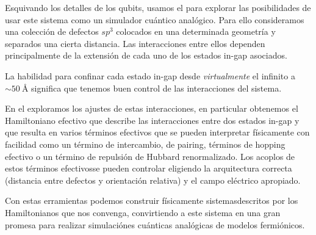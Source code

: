 Esquivando los detalles de los qubits, usamos el  para explorar las posibilidades de usar este sistema como un simulador cuántico analógico. Para ello consideramos una colección de defectos $sp^3$ colocados en una determinada geometría y separados una cierta distancia.
Las interacciones entre ellos dependen principalmente de la extensión de cada uno de los estados in-gap asociados.

La habilidad para confinar cada estado in-gap desde \emph{virtualmente} el infinito a $\sim\SI{50}{\angstrom}$ significa que tenemos buen control de las interacciones del sistema.


En el  exploramos los ajustes de estas interacciones, en particular obtenemos el Hamiltoniano efectivo que describe las interacciones entre dos estados in-gap y que resulta en varios términos efectivos que se pueden interpretar físicamente con facilidad como un término de intercambio, de pairing, términos de hopping efectivo o un término de repulsión de Hubbard renormalizado. Los acoplos de estos términos efectivosse pueden controlar eligiendo la arquitectura correcta (distancia entre defectos y orientación relativa) y el campo eléctrico apropiado.

Con estas erramientas podemos construir físicamente sistemasdescritos por los Hamiltonianos que nos convenga, convirtiendo a este sistema en una gran promesa para realizar simulaciónes cuánticas analógicas de modelos fermiónicos.
